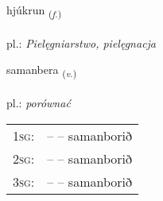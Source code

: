 \documentclass[frontgrid, backgrid]{flacards}\usepackage[]{graphicx}\usepackage[]{xcolor}
\begin{document}
\renewcommand{\flhead}{\vskip5pt \fboxsep=0pt {\small\bfseries\footnotesize Nafnorð | rzeczownik}}
\renewcommand{\fcfoot}{\vskip5pt \fboxsep=0pt \hspace{2pt}{\small\bfseries\footnotesize 3K}}

\renewcommand{\blhead}{\vskip5pt {\small\bfseries\footnotesize Nafnorð | rzeczownik }}
\renewcommand{\bcfoot}{\vskip5pt \hspace{2pt}{\small\bfseries\footnotesize 3K}}


{hjúkrun \small{\textsubscript{(\textit{f.})}} \\[1ex] %
\textphonetic{[çuːkrʏn]} \\
pl.: \emph{Pielęgniarstwo, pielęgnacja} \\  [2ex]
\renewcommand*{\arraystretch}{0.8}
}

\renewcommand{\flhead}{\vskip5pt \fboxsep=0pt {\small\bfseries\footnotesize Sagnorð | czasownik}}
\renewcommand{\fcfoot}{\vskip5pt \fboxsep=0pt \hspace{2pt}{\small\bfseries\footnotesize 3K}}

\renewcommand{\blhead}{\vskip5pt {\small\bfseries\footnotesize Sagnorð | czasownik }}
\renewcommand{\bcfoot}{\vskip5pt \hspace{2pt}{\small\bfseries\footnotesize 3K}}


{samanbera \small{\textsubscript{(\textit{v.})}} \\[1ex] %
\textphonetic{[saːmanpɛra]} \\
pl.: \emph{porównać} \\  [2ex]
\renewcommand*{\arraystretch}{0.8}
\begin{tabular}{p{1cm}l}
\textsc{1sg}: &  --  -- samanborið \\ 
\textsc{2sg}: &  --  -- samanborið \\ 
\textsc{3sg}: &  --  -- samanborið \\ 
\end{tabular}
}
\end{document}
